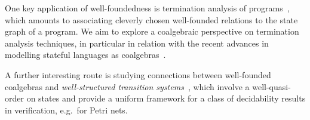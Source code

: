 One key application of well-foundedness is termination analysis of programs~\cite{cpr11}, which amounts to associating cleverly chosen well-founded relations to the state graph of a program. We aim to explore a coalgebraic perspective on termination analysis techniques, in particular in relation with the recent advances in modelling stateful languages as coalgebras~\cite{gmstu25}. 

A further interesting route is studying connections between well-founded coalgebras and \emph{well-structured transition systems}~\cite{fs01}, which involve a well-quasi-order on states and provide a uniform framework for a class of decidability results in verification, e.g.~for Petri nets.



